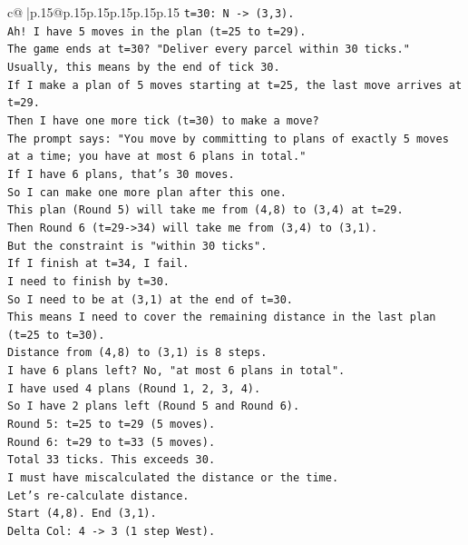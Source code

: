 \documentclass{article}
\begin{document}
{\begin{supertabular}{c@{$\;$}|p{.15\linewidth}@{}p{.15\linewidth}p{.15\linewidth}p{.15\linewidth}p{.15\linewidth}p{.15\linewidth}}
{{{\texttt{t=30: N {-}> (3,3).} \\
\texttt{Ah! I have 5 moves in the plan (t=25 to t=29).} \\
\texttt{The game ends at t=30? "Deliver every parcel within 30 ticks."} \\
\texttt{Usually, this means by the end of tick 30.} \\
\texttt{If I make a plan of 5 moves starting at t=25, the last move arrives at t=29.} \\
\texttt{Then I have one more tick (t=30) to make a move?} \\
\texttt{The prompt says: "You move by committing to plans of exactly 5 moves at a time; you have at most 6 plans in total."} \\
\texttt{If I have 6 plans, that's 30 moves.} \\
\texttt{So I can make one more plan after this one.} \\
\texttt{This plan (Round 5) will take me from (4,8) to (3,4) at t=29.} \\
\texttt{Then Round 6 (t=29{-}>34) will take me from (3,4) to (3,1).} \\
\texttt{But the constraint is "within 30 ticks".} \\
\texttt{If I finish at t=34, I fail.} \\
\texttt{I need to finish by t=30.} \\
\texttt{So I need to be at (3,1) at the end of t=30.} \\
\texttt{This means I need to cover the remaining distance in the last plan (t=25 to t=30).} \\
\texttt{Distance from (4,8) to (3,1) is 8 steps.} \\
\texttt{I have 6 plans left? No, "at most 6 plans in total".} \\
\texttt{I have used 4 plans (Round 1, 2, 3, 4).} \\
\texttt{So I have 2 plans left (Round 5 and Round 6).} \\
\texttt{Round 5: t=25 to t=29 (5 moves).} \\
\texttt{Round 6: t=29 to t=33 (5 moves).} \\
\texttt{Total 33 ticks. This exceeds 30.} \\
\texttt{I must have miscalculated the distance or the time.} \\
\texttt{Let's re{-}calculate distance.} \\
\texttt{Start (4,8). End (3,1).} \\
\texttt{Delta Col: 4 {-}> 3 (1 step West).} \\
}}}
\end{supertabular}}
\end{document}
